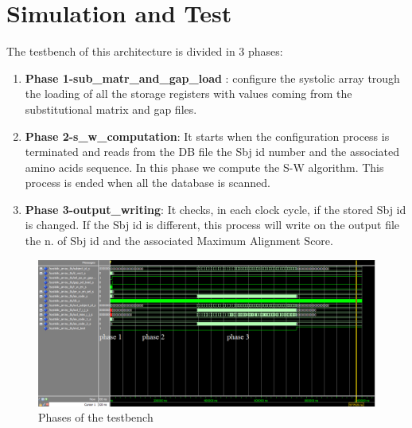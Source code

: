 \section{Simulation and Test}
The testbench of this architecture is divided in 3 phases:
\begin{enumerate}
	\item \textbf{Phase 1-sub\_matr\_and\_gap\_load }:  configure the systolic array trough the loading of all the storage registers with values coming from the substitutional matrix and gap files.\\
	\item  \textbf{Phase 2-s\_w\_computation}: It starts when the configuration process is terminated and reads from the DB file the Sbj id number and the associated amino acids sequence. In this phase we compute the S-W algorithm. This process is ended when all the database is scanned.\\
	\item \textbf{Phase 3-output\_writing}: It checks, in each clock cycle, if the stored Sbj id is changed. If the Sbj id is different, this process will write on the output file the n. of Sbj id and the associated Maximum Alignment Score.
	
	
	
\end{enumerate}
\begin{figure}[h!]
	\centering
	\includegraphics[width=\textwidth]{imm/sw/tb_systolic_array_phases.png} 	\caption{Phases of the testbench} 
	\label{tb_sw}
\end{figure}

